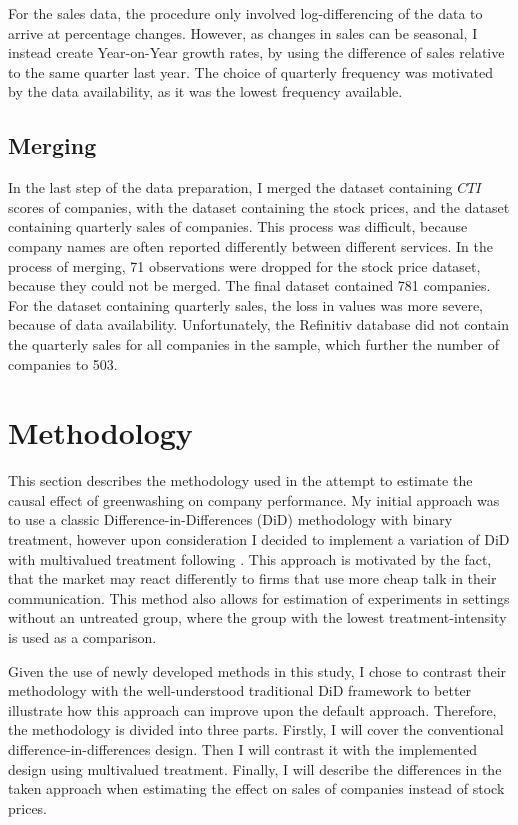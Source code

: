 \documentclass[12pt]{article}
\begin{document}
For the sales data, the procedure only involved log-differencing of the data to arrive at percentage changes. However, as changes in sales can be seasonal, I instead create Year-on-Year growth rates, by using the difference of sales relative to the same quarter last year. The choice of quarterly frequency was motivated by the data availability, as it was the lowest frequency available. 


\subsection{Merging}

In the last step of the data preparation, I merged the dataset containing $CTI$ scores of companies, with the dataset containing the stock prices, and the dataset containing quarterly sales of companies. This process was difficult, because company names are often reported differently between different services. In the process of merging, 71 observations were dropped for the stock price dataset, because they could not be merged. The final dataset contained 781 companies. For the dataset containing quarterly sales, the loss in values was more severe, because of data availability. Unfortunately, the Refinitiv database did not contain the quarterly sales for all companies in the sample, which further the number of companies to 503.


\section{Methodology}\label{sect:methodology}

This section describes the methodology used in the attempt to estimate the causal effect of greenwashing on company performance.
My initial approach was to use a classic Difference-in-Differences (DiD) methodology with binary treatment, however upon consideration I decided to implement a variation of DiD with multivalued treatment following \textcite{callawayDifferenceinDifferencesContinuousTreatment2025}. This approach is motivated by the fact, that the market may react differently to firms that use more cheap talk in their communication. This method also allows for estimation of experiments in settings without an untreated group, where the group with the lowest treatment-intensity is used as a comparison. 

Given the use of newly developed methods in this study, I chose to contrast their methodology with the well-understood traditional DiD framework to better illustrate how this approach can improve upon the default approach. Therefore, the methodology is divided into three parts. Firstly, I will cover the conventional difference-in-differences design. Then I will contrast it with the implemented design using multivalued treatment. Finally, I will describe the differences in the taken approach when estimating the effect on sales of companies instead of stock prices.
\end{document}
